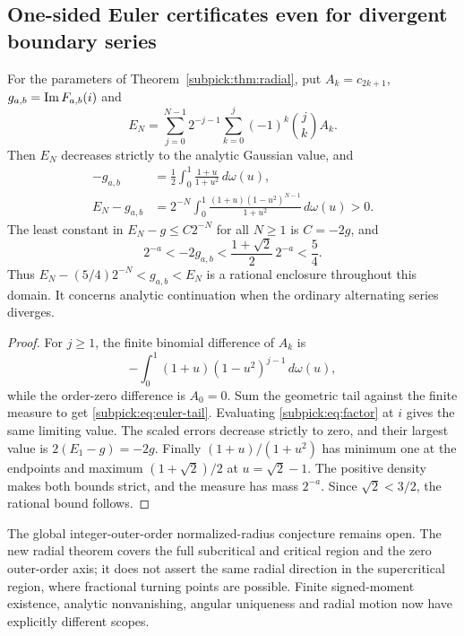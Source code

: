 \subsection{One-sided Euler certificates even for divergent boundary series}
\begin{theorem}
\label{subpick:thm:euler}
For the parameters of Theorem~\ref{subpick:thm:radial}, put
$A_k=c_{2k+1}$, $g_{a,b}=\operatorname{Im} F_{a,b}(i)$ and
\[
 E_N=\sum_{j=0}^{N-1}2^{-j-1}
             \sum_{k=0}^j(-1)^k\binom jk A_k.
\]
Then $E_N$ decreases strictly to the analytic Gaussian value, and
\begin{align}
 -g_{a,b}&=\frac12\int_0^1\frac{1+u}{1+u^2}\,d\omega(u),\\
 E_N-g_{a,b}&=2^{-N}\int_0^1
       \frac{(1+u)(1-u^2)^{N-1}}{1+u^2}\,d\omega(u)>0.
       \label{subpick:eq:euler-tail}
\end{align}
The least constant in $E_N-g\le C2^{-N}$ for all $N\ge1$ is
$C=-2g$, and
\[
 2^{-a}<-2g_{a,b}<\frac{1+\sqrt2}{2}\,2^{-a}<\frac54.
\]
Thus $E_N-(5/4)2^{-N}<g_{a,b}<E_N$ is a rational enclosure throughout
this domain. It concerns analytic continuation when the ordinary
alternating series diverges.
\end{theorem}
\begin{proof}
For $j\ge1$, the finite binomial difference of $A_k$ is
\[
 -\int_0^1(1+u)(1-u^2)^{j-1}\,d\omega(u),
\]
while the order-zero difference is $A_0=0$. Sum the geometric tail
against the finite measure to get \eqref{subpick:eq:euler-tail}.
Evaluating \eqref{subpick:eq:factor} at $i$ gives the same limiting
value. The scaled errors decrease strictly to zero, and their largest
value is $2(E_1-g)=-2g$. Finally $(1+u)/(1+u^2)$ has minimum one
at the endpoints and maximum $(1+\sqrt2)/2$ at $u=\sqrt2-1$.
The positive density makes both bounds strict, and the measure has
mass $2^{-a}$. Since $\sqrt2<3/2$, the rational bound follows.
\end{proof}

The global integer-outer-order normalized-radius conjecture remains open.
The new radial theorem covers the full subcritical and critical region
and the zero outer-order axis; it does not assert the same radial
direction in the supercritical region, where fractional turning points
are possible. Finite signed-moment existence, analytic nonvanishing,
angular uniqueness and radial motion now have explicitly different scopes.

